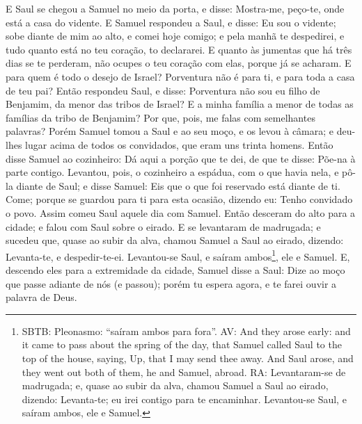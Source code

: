 E Saul se chegou a Samuel no meio da porta, e disse: Mostra-me,
peço-te, onde está a casa do vidente. E Samuel respondeu a
Saul, e disse: Eu sou o vidente; sobe diante de mim ao alto, e comei
hoje comigo; e pela manhã te despedirei, e tudo quanto está no teu
coração, to declararei. E quanto às jumentas que há três dias
se te perderam, não ocupes o teu coração com elas, porque já se
acharam. E para quem é todo o desejo de Israel? Porventura não é
para ti, e para toda a casa de teu pai? Então respondeu Saul,
e disse: Porventura não sou eu filho de Benjamim, da menor das
tribos de Israel? E a minha família a menor de todas as famílias da
tribo de Benjamim? Por que, pois, me falas com semelhantes palavras?
Porém Samuel tomou a Saul e ao seu moço, e os levou à câmara;
e deu-lhes lugar acima de todos os convidados, que eram uns trinta
homens. Então disse Samuel ao cozinheiro: Dá aqui a porção
que te dei, de que te disse: Põe-na à parte contigo.
Levantou, pois, o cozinheiro a espádua, com o que havia nela,
e pô-la diante de Saul; e disse Samuel: Eis que o que foi reservado
está diante de ti. Come; porque se guardou para ti para esta
ocasião, dizendo eu: Tenho convidado o povo. Assim comeu Saul aquele
dia com Samuel. Então desceram do alto para a cidade; e falou
com Saul sobre o eirado. E se levantaram de madrugada; e
sucedeu que, quase ao subir da alva, chamou Samuel a Saul ao eirado,
dizendo: Levanta-te, e despedir-te-ei. Levantou-se Saul, e saíram
ambos\footnote{SBTB: Pleonasmo: ``saíram ambos para fora''. AV: And
they arose early: and it came to pass about the spring of the day,
that Samuel called Saul to the top of the house, saying, Up, that I
may send thee away. And Saul arose, and they went out both of them,
he and Samuel, abroad. RA: Levantaram-se de madrugada; e, quase ao
subir da alva, chamou Samuel a Saul ao eirado, dizendo: Levanta-te;
eu irei contigo para te encaminhar. Levantou-se Saul, e saíram
ambos, ele e Samuel.}, ele e Samuel. E, descendo eles para a
extremidade da cidade, Samuel disse a Saul: Dize ao moço que passe
adiante de nós (e passou); porém tu espera agora, e te farei ouvir a
palavra de Deus.

\medskip

